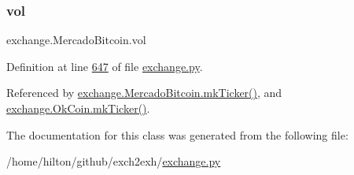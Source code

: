 \subsubsection{\texorpdfstring{vol}{vol}}
{\footnotesize\ttfamily exchange.\+Mercado\+Bitcoin.\+vol}



Definition at line \hyperlink{exchange_8py_source_l00647}{647} of file \hyperlink{exchange_8py_source}{exchange.\+py}.



Referenced by \hyperlink{exchange_8py_source_l00665}{exchange.\+Mercado\+Bitcoin.\+mk\+Ticker()}, and \hyperlink{exchange_8py_source_l00730}{exchange.\+Ok\+Coin.\+mk\+Ticker()}.



The documentation for this class was generated from the following file\+:\begin{DoxyCompactItemize}
\item 
/home/hilton/github/exch2exh/\hyperlink{exchange_8py}{exchange.\+py}\end{DoxyCompactItemize}
